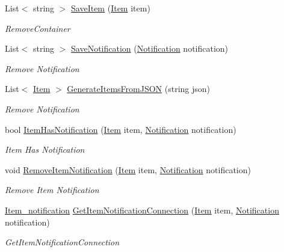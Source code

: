 \begin{DoxyCompactItemize}
List$<$ string $>$ \mbox{\hyperlink{class_gtd_app_1_1_logic_1_1_business_logic_aa2d4df27597225785568ee11da249971}{Save\+Item}} (\mbox{\hyperlink{class_gtd_app_1_1_data_1_1_item}{Item}} item)
\begin{DoxyCompactList}\small\item\em Remove\+Container \end{DoxyCompactList}\item 
List$<$ string $>$ \mbox{\hyperlink{class_gtd_app_1_1_logic_1_1_business_logic_afa15e2ec378237a34cc2d8fd14c281d6}{Save\+Notification}} (\mbox{\hyperlink{class_gtd_app_1_1_data_1_1_notification}{Notification}} notification)
\begin{DoxyCompactList}\small\item\em Remove Notification \end{DoxyCompactList}\item 
List$<$ \mbox{\hyperlink{class_gtd_app_1_1_data_1_1_item}{Item}} $>$ \mbox{\hyperlink{class_gtd_app_1_1_logic_1_1_business_logic_afec34569688cddd4d4b5232372a99612}{Generate\+Items\+From\+J\+S\+ON}} (string json)
\begin{DoxyCompactList}\small\item\em Remove Notification \end{DoxyCompactList}\item 
bool \mbox{\hyperlink{class_gtd_app_1_1_logic_1_1_business_logic_a57c1ed0fce56cce1be786e183b5bddd4}{Item\+Has\+Notification}} (\mbox{\hyperlink{class_gtd_app_1_1_data_1_1_item}{Item}} item, \mbox{\hyperlink{class_gtd_app_1_1_data_1_1_notification}{Notification}} notification)
\begin{DoxyCompactList}\small\item\em Item Has Notification \end{DoxyCompactList}\item 
void \mbox{\hyperlink{class_gtd_app_1_1_logic_1_1_business_logic_abacb4aa7a93675d3f564d2eaeb1c1a0d}{Remove\+Item\+Notification}} (\mbox{\hyperlink{class_gtd_app_1_1_data_1_1_item}{Item}} item, \mbox{\hyperlink{class_gtd_app_1_1_data_1_1_notification}{Notification}} notification)
\begin{DoxyCompactList}\small\item\em Remove Item Notification \end{DoxyCompactList}\item 
\mbox{\hyperlink{class_gtd_app_1_1_data_1_1_item__notification}{Item\+\_\+notification}} \mbox{\hyperlink{class_gtd_app_1_1_logic_1_1_business_logic_a0983441bb341546b8fd9f6ebfb55b0df}{Get\+Item\+Notification\+Connection}} (\mbox{\hyperlink{class_gtd_app_1_1_data_1_1_item}{Item}} item, \mbox{\hyperlink{class_gtd_app_1_1_data_1_1_notification}{Notification}} notification)
\begin{DoxyCompactList}\small\item\em Get\+Item\+Notification\+Connection \end{DoxyCompactList}\end{DoxyCompactItemize}
